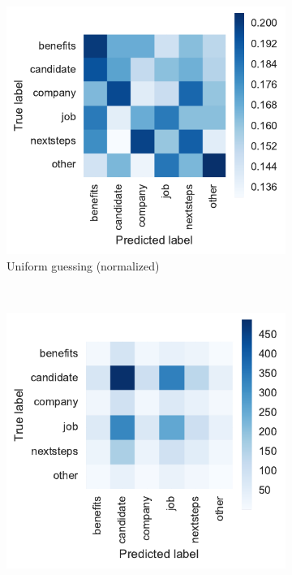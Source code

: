 \begin{figure}
\begin{subfigure}[b]{0.48\textwidth}
        \includegraphics[width=\textwidth]{img/exp-vector-space/guessing-conf-matrix-uniform-normalized.pdf}
        \caption{Uniform guessing (normalized)}
\label{fig:guessing-conf-matrix-uniform-normalized}
    \end{subfigure}
~\begin{subfigure}[b]{0.47\textwidth}
        \includegraphics[width=\textwidth]{img/exp-vector-space/guessing-conf-matrix-stratified.pdf}

\end{subfigure}
\end{figure}
